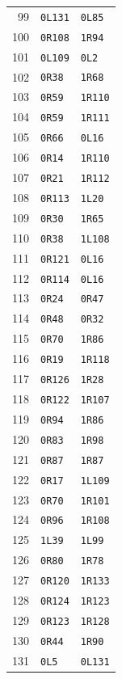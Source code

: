 \begin{center}
\begin{minipage}[t]{0.32\linewidth}
\begin{tabular}{rll}
99&\texttt{0L131}&\texttt{0L85}\\
100&\texttt{0R108}&\texttt{1R94}\\
101&\texttt{0L109}&\texttt{0L2}\\
102&\texttt{0R38}&\texttt{1R68}\\
103&\texttt{0R59}&\texttt{1R110}\\
104&\texttt{0R59}&\texttt{1R111}\\
105&\texttt{0R66}&\texttt{0L16}\\
106&\texttt{0R14}&\texttt{1R110}\\
107&\texttt{0R21}&\texttt{1R112}\\
108&\texttt{0R113}&\texttt{1L20}\\
109&\texttt{0R30}&\texttt{1R65}\\
110&\texttt{0R38}&\texttt{1L108}\\
111&\texttt{0R121}&\texttt{0L16}\\
112&\texttt{0R114}&\texttt{0L16}\\
113&\texttt{0R24}&\texttt{0R47}\\
114&\texttt{0R48}&\texttt{0R32}\\
115&\texttt{0R70}&\texttt{1R86}\\
116&\texttt{0R19}&\texttt{1R118}\\
117&\texttt{0R126}&\texttt{1R28}\\
118&\texttt{0R122}&\texttt{1R107}\\
119&\texttt{0R94}&\texttt{1R86}\\
120&\texttt{0R83}&\texttt{1R98}\\
121&\texttt{0R87}&\texttt{1R87}\\
122&\texttt{0R17}&\texttt{1L109}\\
123&\texttt{0R70}&\texttt{1R101}\\
124&\texttt{0R96}&\texttt{1R108}\\
125&\texttt{1L39}&\texttt{1L99}\\
126&\texttt{0R80}&\texttt{1R78}\\
127&\texttt{0R120}&\texttt{1R133}\\
128&\texttt{0R124}&\texttt{1R123}\\
129&\texttt{0R123}&\texttt{1R128}\\
130&\texttt{0R44}&\texttt{1R90}\\
131&\texttt{0L5}&\texttt{0L131}\\
\bottomrule\end{tabular}\end{minipage}
\hfill
\begin{minipage}[t]{0.32\linewidth}\centering

\end{minipage}
\end{center}
